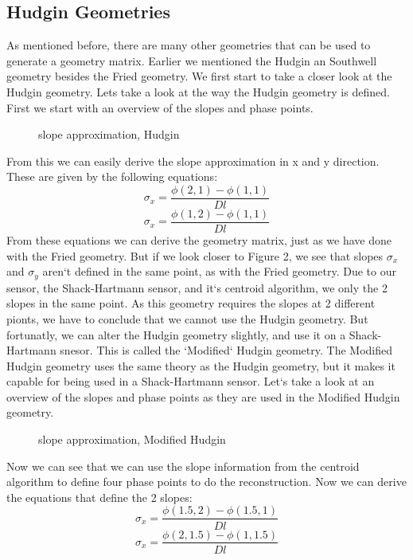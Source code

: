 \documentclass{article}
\begin{document}
\subsection{Hudgin Geometries}
As mentioned before, there are many other geometries that can be used to generate a geometry matrix. Earlier we mentioned the Hudgin an Southwell geometry besides the Fried geometry. We first start to take a closer look at the Hudgin geometry.
\newline
\newline
Lets take a look at the way the Hudgin geometry is defined. First we start with an overview of the slopes and phase points.
\begin{figure}[h!]
  \centering
  \caption{slope approximation, Hudgin}
\end{figure}
From this we can easily derive the slope approximation in x and y direction. These are given by the following equations:
$$ \sigma_x = \frac{\phi(2,1)-\phi(1,1)}{Dl}$$
$$ \sigma_x = \frac{\phi(1,2)-\phi(1,1)}{Dl}$$
From these equations we can derive the geometry matrix, just as we have done with the Fried geometry. But if we look closer to Figure 2, we see that slopes $\sigma_x$ and $\sigma_y$ aren`t defined in the same point, as with the Fried geometry. Due to our sensor, the Shack-Hartmann sensor, and it`s centroid algorithm, we only the 2 slopes in the same point. As this geometry requires the slopes at 2 different pionts, we have to conclude that we cannot use the Hudgin geometry. But fortunatly, we can alter the Hudgin geometry slightly, and use it on a Shack-Hartmann snesor. This is called the `Modified` Hudgin geometry.
\newline
\newline
The Modified Hudgin geometry uses the same theory as the Hudgin geometry, but it makes it capable for being used in a Shack-Hartmann sensor. Let`s take a look at an overview of the slopes and phase points as they are used in the Modified Hudgin geometry.  
\newpage
\begin{figure}[h!]
  \centering
  \caption{slope approximation, Modified Hudgin}
\end{figure}
\noindent Now we can see that we can use the slope information from the centroid algorithm to define four phase points to do the reconstruction. Now we can derive the equations that define the 2 slopes:
$$ \sigma_x = \frac{\phi(1.5,2)-\phi(1.5,1)}{Dl}$$
$$ \sigma_x = \frac{\phi(2,1.5)-\phi(1,1.5)}{Dl}$$
\end{document}
